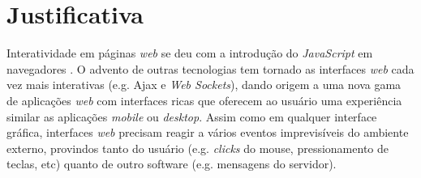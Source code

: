 \section{Justificativa}\label{ljustificativa}


Interatividade em páginas \textit{web} se deu com a introdução do
\textit{JavaScript} em navegadores
\cite{
  paolini1995netscape,
  thau2000javascript}.
O advento de outras tecnologias tem tornado as interfaces \textit{web}
cada vez mais interativas
(e.g. Ajax e \textit{Web Sockets\footnotemark}),
dando origem a uma nova gama de aplicações \textit{web} com interfaces ricas que oferecem ao usuário uma
experiência similar as aplicações \textit{mobile} ou \textit{desktop}.
Assim como em qualquer interface gráfica, interfaces \textit{web} precisam reagir
a vários eventos imprevisíveis do ambiente externo,
provindos tanto do usuário (e.g. \textit{clicks} do mouse, pressionamento de teclas, etc) %
quanto de outro software (e.g. mensagens do servidor). %

